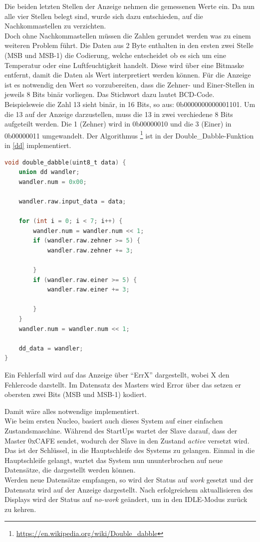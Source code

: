\documentclass[11pt,a4paper,titlepage]{article}
\begin{document}
Die beiden letzten Stellen der Anzeige nehmen die gemessenen Werte ein.
Da nun alle vier Stellen belegt sind, wurde sich dazu entschieden, auf die Nachkommastellen zu verzichten.\\

Doch ohne Nachkommastellen müssen die Zahlen gerundet werden was zu einem weiteren Problem führt.
Die Daten aus 2 Byte enthalten in den ersten zwei Stelle (MSB und MSB-1) die Codierung,
welche entscheidet ob es sich um eine Temperatur oder eine Luftfeuchtigkeit handelt.
Diese wird über eine Bitmaske entfernt, damit die Daten als Wert interpretiert werden können.
Für die Anzeige ist es notwendig den Wert so vorzubereiten, dass die Zehner- und Einer-Stellen in jeweils 8 Bits binär vorliegen.
Das Stichwort dazu lautet BCD-Code.\\
Beispielsweie die Zahl 13 sieht binär, in 16 Bits, so aus: 0b0000000000001101.
Um die 13 auf der Anzeige darzustellen, muss die 13 in zwei verchiedene 8 Bits aufgeteilt werden.
Die 1 (Zehner) wird in 0b00000010 und die 3 (Einer) in 0b00000011 umgewandelt.
Der Algorithmus
\footnote{\url{https://en.wikipedia.org/wiki/Double_dabble}}
ist in der Double\_Dabble-Funktion in \cref{dd} implementiert.



\begin{lstlisting}[language=C, label={dd}, caption={Double Dabble Funktion}]
void double_dabble(uint8_t data) {
	union dd wandler;
	wandler.num = 0x00;

	wandler.raw.input_data = data;

	for (int i = 0; i < 7; i++) {
		wandler.num = wandler.num << 1;
		if (wandler.raw.zehner >= 5) {
			wandler.raw.zehner += 3;

		}
		if (wandler.raw.einer >= 5) {
			wandler.raw.einer += 3;

		}
	}
	wandler.num = wandler.num << 1;

	dd_data = wandler;
}

\end{lstlisting}



Ein Fehlerfall wird auf das Anzeige über ``ErrX'' dargestellt, wobei X den Fehlercode darstellt.
Im Datensatz des Masters wird Error über das setzen er obersten zwei Bits (MSB und MSB-1) kodiert.

Damit wäre alles notwendige implementiert.\\

Wie beim ersten Nucleo, basiert auch dieses System auf einer einfachen Zustandsmaschine.
Während des StartUps wartet der Slave darauf, dass der Master 0xCAFE sendet, wodurch der Slave in den Zustand \textit{active} versetzt wird.
Das ist der Schlüssel, in die Hauptschleife des Systems zu gelangen.
Einmal in die Hauptschleife gelangt, wartet das System nun ununterbrochen auf neue Datensätze, 
die dargestellt werden können.\\
Werden neue Datensätze empfangen, so wird der Status auf \textit{work} gesetzt und der Datensatz wird auf der Anzeige dargestellt.
Nach erfolgreichem aktuallisieren des Displays wird der Status auf \textit{no-work} geändert, um in den IDLE-Modus zurück zu kehren.\\
\end{document}
